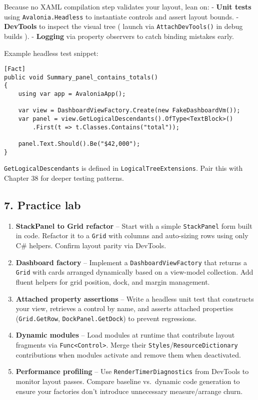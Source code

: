 Because no XAML compilation step validates your layout, lean on: -
\textbf{Unit tests} using \passthrough{\lstinline!Avalonia.Headless!} to
instantiate controls and assert layout bounds. - \textbf{DevTools} to
inspect the visual tree ( launch via
\passthrough{\lstinline!AttachDevTools()!} in debug builds ). -
\textbf{Logging} via property observers to catch binding mistakes early.

Example headless test snippet:

\begin{lstlisting}
[Fact]
public void Summary_panel_contains_totals()
{
    using var app = AvaloniaApp();

    var view = DashboardViewFactory.Create(new FakeDashboardVm());
    var panel = view.GetLogicalDescendants().OfType<TextBlock>()
        .First(t => t.Classes.Contains("total"));

    panel.Text.Should().Be("$42,000");
}
\end{lstlisting}

\passthrough{\lstinline!GetLogicalDescendants!} is defined in
\passthrough{\lstinline!LogicalTreeExtensions!}. Pair this with Chapter
38 for deeper testing patterns.

\subsection{7. Practice lab}\label{practice-lab-1}

\begin{enumerate}
\def\labelenumi{\arabic{enumi}.}
\tightlist
\item
  \textbf{StackPanel to Grid refactor} -- Start with a simple
  \passthrough{\lstinline!StackPanel!} form built in code. Refactor it
  to a \passthrough{\lstinline!Grid!} with columns and auto-sizing rows
  using only C\# helpers. Confirm layout parity via DevTools.
\item
  \textbf{Dashboard factory} -- Implement a
  \passthrough{\lstinline!DashboardViewFactory!} that returns a
  \passthrough{\lstinline!Grid!} with cards arranged dynamically based
  on a view-model collection. Add fluent helpers for grid position,
  dock, and margin management.
\item
  \textbf{Attached property assertions} -- Write a headless unit test
  that constructs your view, retrieves a control by name, and asserts
  attached properties (\passthrough{\lstinline!Grid.GetRow!},
  \passthrough{\lstinline!DockPanel.GetDock!}) to prevent regressions.
\item
  \textbf{Dynamic modules} -- Load modules at runtime that contribute
  layout fragments via \passthrough{\lstinline!Func<Control>!}. Merge
  their
  \passthrough{\lstinline!Styles!}/\passthrough{\lstinline!ResourceDictionary!}
  contributions when modules activate and remove them when deactivated.
\item
  \textbf{Performance profiling} -- Use
  \passthrough{\lstinline!RenderTimerDiagnostics!} from DevTools to
  monitor layout passes. Compare baseline vs.~dynamic code generation to
  ensure your factories don't introduce unnecessary measure/arrange
  churn.
\end{enumerate}

